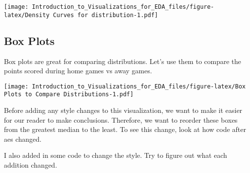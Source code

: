 \documentclass[]{article}
\newenvironment{Shaded}{\begin{snugshade}}{\end{snugshade}}
\newcommand{\DataTypeTok}[1]{\textcolor[rgb]{0.13,0.29,0.53}{#1}}
\newcommand{\KeywordTok}[1]{\textcolor[rgb]{0.13,0.29,0.53}{\textbf{#1}}}
\newcommand{\NormalTok}[1]{#1}
\newcommand{\OperatorTok}[1]{\textcolor[rgb]{0.81,0.36,0.00}{\textbf{#1}}}
\newcommand{\StringTok}[1]{\textcolor[rgb]{0.31,0.60,0.02}{#1}}
\begin{document}
\texttt{[image: Introduction\_to\_Visualizations\_for\_EDA\_files/figure-latex/Density Curves for distribution-1.pdf]}

\hypertarget{box-plots}{%
\subsection{Box Plots}\label{box-plots}}

Box plots are great for comparing distributions. Let's use them to
compare the points scored during home games vs away games.

\begin{Shaded}
\end{Shaded}

\texttt{[image: Introduction\_to\_Visualizations\_for\_EDA\_files/figure-latex/Box Plots to Compare Distributions-1.pdf]}

Before adding any style changes to this visualization, we want to make
it easier for our reader to make conclusions. Therefore, we want to
reorder these boxes from the greatest median to the least. To see this
change, look at how code after aes changed.

I also added in some code to change the style. Try to figure out what
each addition changed.
\end{document}
